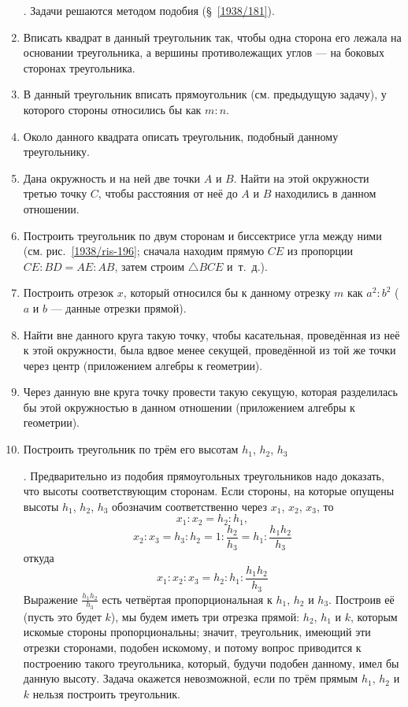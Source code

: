 \documentclass[oneside]{book}
\begin{document}
\begin{enumerate}[resume]
.
Задачи решаются методом подобия (§~\ref{1938/181}).

 \item
Вписать квадрат в данный треугольник так, чтобы одна сторона его лежала на основании треугольника, а вершины противолежащих углов — на боковых сторонах треугольника.

 \item
В данный треугольник вписать прямоугольник (см. предыдущую задачу), у которого стороны относились бы как $m:n$.

 \item
Около данного квадрата описать треугольник, подобный данному треугольнику.

 \item
Дана окружность и на ней две точки $A$ и $B$.
Найти на этой окружности третью точку $C$, чтобы расстояния от неё до $A$ и $B$ находились в данном отношении.

 \item
Построить треугольник по двум сторонам и биссектрисе угла между ними (см. рис.~\ref{1938/ris-196};
сначала находим прямую $CE$ из пропорции $CE:BD=AE:AB$, затем строим $\triangle BCE$ и~т.~д.).

 \item
Построить отрезок $x$, который относился бы к данному отрезку $m$ как $a^2:b^2$ ($a$ и $b$ — данные отрезки прямой).

 \item
Найти вне данного круга такую точку, чтобы касательная, проведённая из неё к этой окружности, была вдвое менее секущей, проведённой из той же точки через центр (приложением алгебры к геометрии).

 \item
Через данную вне круга точку провести такую секущую, которая разделилась бы этой окружностью в данном отношении (приложением алгебры к геометрии).

 \item
Построить треугольник по трём его высотам $h_1$, $h_2$, $h_3$

.
Предварительно из подобия прямоугольных треугольников надо доказать, что высоты  соответствующим сторонам.
Если стороны, на которые опущены высоты $h_1$, $h_2$, $h_3$ обозначим соответственно через $x_1$, $x_2$, $x_3$, то
\[x_1:x_2=h_2:h_1,\]
\[x_2:x_3=h_3:h_2=1:\frac{h_2}{h_3}=h_1:\frac{h_1h_2}{h_3}\]
откуда 
\[x_1:x_2:x_3=h_2:h_1:\frac{h_1h_2}{h_3}\]
Выражение $\frac{h_1h_2}{h_3}$ есть четвёртая пропорциональная к $h_1$, $h_2$ и $h_3$.
Построив её (пусть это будет $k$), мы будем иметь три отрезка прямой:
$h_2$, $h_1$ и $k$, которым искомые стороны пропорциональны;
значит, треугольник, имеющий эти отрезки сторонами, подобен искомому, и потому вопрос приводится к построению такого треугольника, который, будучи подобен данному, имел бы данную высоту.
Задача окажется невозможной, если по трём прямым $h_1$, $h_2$ и $k$ нельзя построить треугольник.


\end{enumerate}
\end{document}
